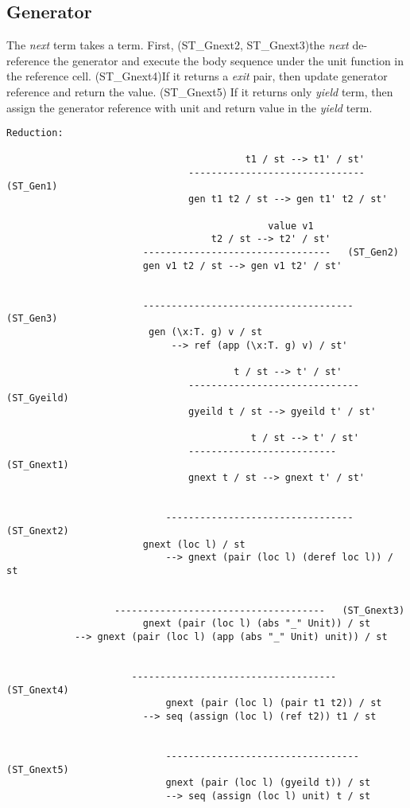 \subsection{Generator}
The \textit{next} term takes a \gen term. First, (ST_Gnext2, ST_Gnext3)the \textit{next} de-reference the generator and execute the body sequence under the unit function in the reference cell. (ST_Gnext4)If it returns a \textit{exit} pair, then update generator reference and return the value. (ST_Gnext5) If it returns only \textit{yield} term, then assign the generator reference with unit and return value in the \textit{yield} term.
\begin{lstlisting}
Reduction:

										  t1 / st --> t1' / st'
								-------------------------------   (ST_Gen1)
								gen t1 t2 / st --> gen t1' t2 / st'

											  value v1
									t2 / st --> t2' / st'
						---------------------------------   (ST_Gen2)
						gen v1 t2 / st --> gen v1 t2' / st'
							  
							  
						------------------------------------- (ST_Gen3)
						 gen (\x:T. g) v / st
							 --> ref (app (\x:T. g) v) / st'
													
									    t / st --> t' / st'
								------------------------------   (ST_Gyeild)
								gyeild t / st --> gyeild t' / st'
													
										   t / st --> t' / st'
								--------------------------         (ST_Gnext1)
								gnext t / st --> gnext t' / st'
								

							---------------------------------   (ST_Gnext2)
						gnext (loc l) / st 
							--> gnext (pair (loc l) (deref loc l)) / st
								
						
				   -------------------------------------   (ST_Gnext3)
						gnext (pair (loc l) (abs "_" Unit)) / st
			--> gnext (pair (loc l) (app (abs "_" Unit) unit)) / st
								

					  ------------------------------------    (ST_Gnext4)
							gnext (pair (loc l) (pair t1 t2)) / st
						--> seq (assign (loc l) (ref t2)) t1 / st
								
								
							----------------------------------   (ST_Gnext5)
							gnext (pair (loc l) (gyeild t)) / st
							--> seq (assign (loc l) unit) t / st
												
\end{lstlisting}

